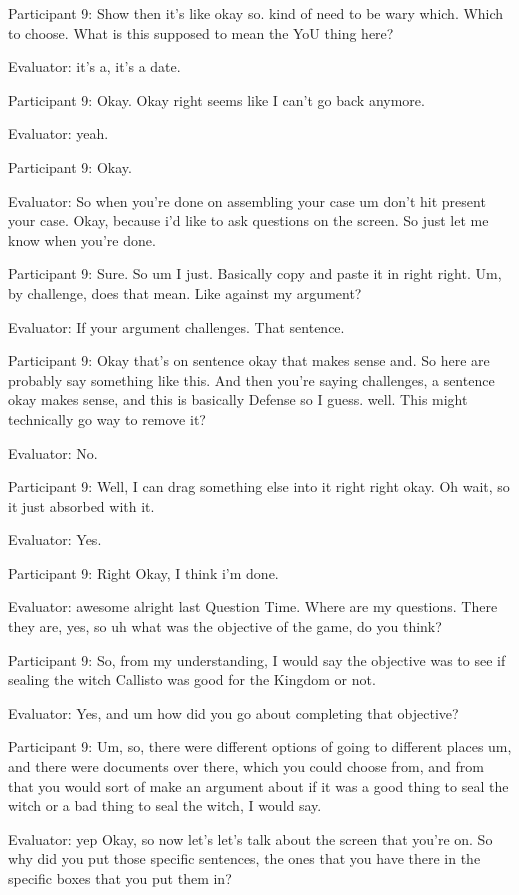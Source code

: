 \documentclass{l4proj}
\begin{document}
\begin{appendices}
Participant 9: Show then it's like okay so. kind of need to be wary which. Which to choose. What is this supposed to mean the YoU thing here?

Evaluator: it's a,  it's a date.

Participant 9: Okay. Okay right seems like I can't go back anymore.

Evaluator: yeah.

Participant 9: Okay.

Evaluator: So when you're done on assembling your case um don't hit present your case. Okay, because i'd like to ask questions on the screen. So just let me know when you're done.

Participant 9: Sure. So um I just. Basically copy and paste it in right right. Um, by challenge, does that mean. Like against my argument?

Evaluator: If your argument challenges. That sentence.

Participant 9: Okay that's on sentence okay that makes sense and. So here are probably say something like this. And then you're saying challenges, a sentence okay makes sense, and this is basically Defense so I guess. well. This might technically go way to remove it?

Evaluator: No.

Participant 9: Well, I can drag something else into it right right okay. Oh wait, so it just absorbed with it.

Evaluator: Yes.

Participant 9: Right Okay, I think i'm done.

Evaluator: awesome alright last Question Time. Where are my questions. There they are, yes, so uh what was the objective of the game, do you think?

Participant 9: So, from my understanding, I would say the objective was to see if sealing the witch Callisto was good for the Kingdom or not.

Evaluator: Yes, and um how did you go about completing that objective?

Participant 9: Um, so, there were different options of going to different places um, and there were documents over there, which you could choose from, and from that you would sort of make an argument about if it was a good thing to seal the witch or a bad thing to seal the witch, I would say.

Evaluator: yep Okay, so now let's let's talk about the screen that you're on. So why did you put those specific sentences, the ones that you have there in the specific boxes that you put them in?


\end{appendices}
\end{document}

